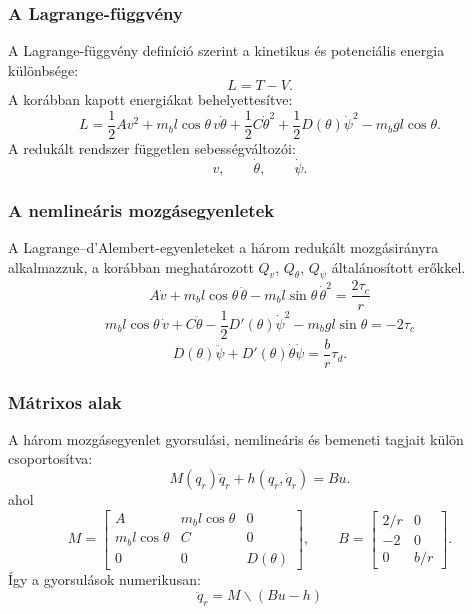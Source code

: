 \documentclass[12pt,a4paper]{report}
\begin{document}
	\subsubsection{A Lagrange-függvény}
	A Lagrange-függvény definíció szerint a kinetikus és potenciális energia különbsége:
	\begin{equation}
	L=T-V.
	\end{equation}
	A korábban kapott energiákat behelyettesítve:
	\begin{equation}
	\boxed{
		L=
		\frac12Av^2
		+m_bl\cos\theta\,v\dot\theta
		+\frac12C\dot\theta^2
		+\frac12D(\theta)\dot\psi^2
		-m_bgl\cos\theta.
	}
	\end{equation}
	A redukált rendszer független sebességváltozói:
	\begin{equation}
	\boxed{v,\qquad \dot\theta,\qquad \dot\psi.}
	\end{equation}
	
	\subsubsection{A nemlineáris mozgásegyenletek}
	A Lagrange–d'Alembert-egyenleteket a három redukált mozgásirányra alkalmazzuk, a korábban meghatározott \(Q_v\), \(Q_\theta\), \(Q_\psi\) általánosított erőkkel.
	\begin{equation}
	\boxed{
		A\dot v+m_bl\cos\theta\,\ddot\theta
		-m_bl\sin\theta\,\dot\theta^2
		=
		\frac{2\tau_c}{r}
	}
	\end{equation}
	\begin{equation}
	\boxed{
		m_bl\cos\theta\,\dot v+C\ddot\theta
		-\frac12D'(\theta)\dot\psi^2
		-m_bgl\sin\theta
		=
		-2\tau_c
	}
	\end{equation}
	\begin{equation}
	\boxed{
		D(\theta)\ddot\psi+D'(\theta)\dot\theta\dot\psi
		=
		\frac br\tau_d.
	}
	\end{equation}
	
	\subsubsection{Mátrixos alak}
	A három mozgásegyenlet gyorsulási, nemlineáris és bemeneti tagjait külön csoportosítva:
	\begin{equation}
	\boxed{
		M(q_r)\ddot q_r+h(q_r,\dot q_r)=Bu.
	}
	\end{equation}
	ahol
	\begin{equation}
	M=
	\begin{bmatrix}
		A&m_bl\cos\theta&0\\
		m_bl\cos\theta&C&0\\
		0&0&D(\theta)
	\end{bmatrix},
	\qquad
	B=
	\begin{bmatrix}
		2/r&0\\
		-2&0\\
		0&b/r
	\end{bmatrix}.
	\end{equation}
	Így a gyorsulások numerikusan:
	\begin{equation}
	\boxed{
		\ddot q_r=M\backslash(Bu-h)
	}
	\end{equation}
	
\end{document}
